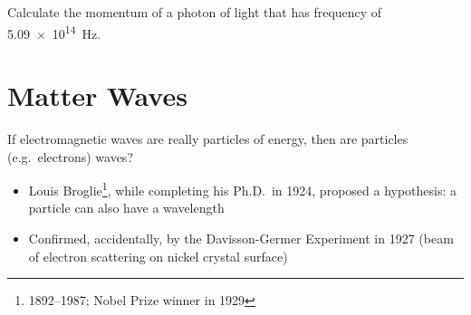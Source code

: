 \begin{example}
  Calculate the momentum of a photon of light that has
  frequency of \SI{5.09e14}\hertz.
\end{example}



\section{Matter Waves}

If electromagnetic waves are really particles of energy, then are particles
(e.g.\ electrons) waves?
\begin{itemize}
\item Louis Broglie\footnote{1892--1987; Nobel Prize winner in 1929},
  while completing his Ph.D.\ in 1924, proposed a hypothesis: a particle can
  also have a wavelength
\item Confirmed, accidentally, by the Davisson-Germer Experiment in 1927
  (beam of electron scattering on nickel crystal surface)
\end{itemize}




%  
%    

